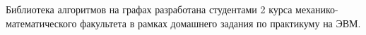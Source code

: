 Библиотека алгоритмов на графах разработана студентами 2 курса механико-\/математического факультета в рамках домашнего задания по практикуму на ЭВМ. 